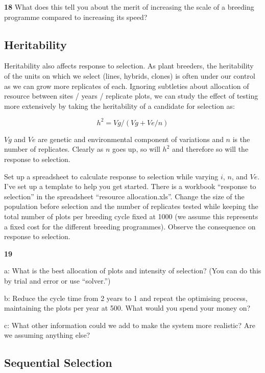 \documentclass[
]{book}
\makeatletter
\newenvironment{kframe}{%
\medskip{}
\setlength{\fboxsep}{.8em}
 \def\at@end@of@kframe{}%
 \ifinner\ifhmode%
  \def\at@end@of@kframe{\end{minipage}}%
  \begin{minipage}{\columnwidth}%
 \fi\fi%
 \def\FrameCommand##1{\hskip\@totalleftmargin \hskip-\fboxsep
 \colorbox{shadecolor}{##1}\hskip-\fboxsep
     \hskip-\linewidth \hskip-\@totalleftmargin \hskip\columnwidth}%
 \MakeFramed {\advance\hsize-\width
   \@totalleftmargin\z@ \linewidth\hsize
   \@setminipage}}%
 {\par\unskip\endMakeFramed%
 \at@end@of@kframe}
\newenvironment{rmdblock}[1]
  {
  \begin{itemize}
  \renewcommand{\labelitemi}{
    \raisebox{-.7\height}[0pt][0pt]{
      {\setkeys{Gin}{width=3em,keepaspectratio}\texttt{[image: images/\#1]}}
    }
  }
  \setlength{\fboxsep}{1em}
  \begin{kframe}
  \item
  }
  {
  \end{kframe}
  \end{itemize}
  }
\newenvironment{rmdquiz}
  {\begin{rmdblock}{quiz}}
  {\end{rmdblock}}
\makeatother
\begin{document}
\begin{rmdquiz}
\textbf{18}
What does this tell you about the merit of increasing the scale of a breeding programme compared to increasing its speed?
\end{rmdquiz}

\hypertarget{heritability}{%
\subsection{Heritability}\label{heritability}}

Heritability also affects response to selection. As plant breeders, the heritability of the units on which we select (lines, hybrids, clones) is often under our control as we can grow more replicates of each. Ignoring subtleties about allocation of resource between sites / years / replicate plots, we can study the effect of testing more extensively by taking the heritability of a candidate for selection as:

\[h^2   = Vg / (Vg + Ve/n)\]

\(Vg\) and \(Ve\) are genetic and environmental component of variations and \(n\) is the number of replicates. Clearly as \(n\) goes up, so will \(h^2\) and therefore so will the response to selection.

Set up a spreadsheet to calculate response to selection while varying \(i\), \(n\), and \(Ve\). I've set up a template to help you get started. There is a workbook ``response to selection'' in the spreadsheet ``resource allocation.xls''. Change the size of the population before selection and the number of replicates tested while keeping the total number of plots per breeding cycle fixed at 1000 (we assume this represents a fixed cost for the different breeding programmes). Observe the consequence on response to selection.

\begin{rmdquiz}
\textbf{19}

a: What is the best allocation of plots and intensity of selection? (You can do this by trial and error or use ``solver.'')

b: Reduce the cycle time from 2 years to 1 and repeat the optimising process, maintaining the plots per year at 500. What would you spend your money on?

c: What other information could we add to make the system more realistic? Are we assuming anything else?
\end{rmdquiz}

\hypertarget{sequential-selection}{%
\subsection{Sequential Selection}\label{sequential-selection}}
\end{document}
